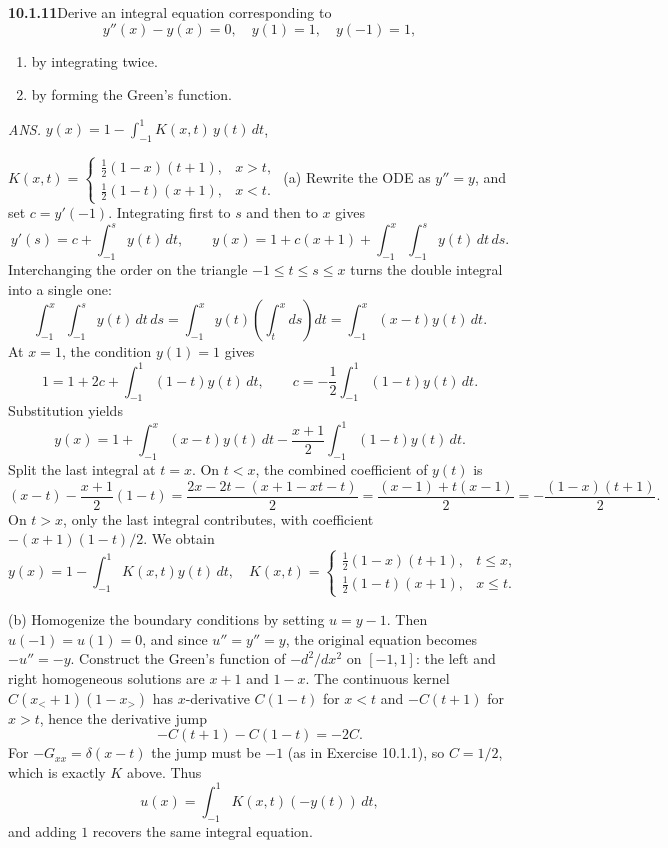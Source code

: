 \par\bigskip
\noindent\textbf{10.1.11}\quad Derive an integral equation corresponding to
\[
y''(x)-y(x)=0,\quad y(1)=1,\quad y(-1)=1,
\]
\begin{enumerate}
\item[(a)] by integrating twice.
\item[(b)] by forming the Green's function.
\end{enumerate}
\par\nobreak\hfill\emph{ANS.}\enspace
$y(x)=1-\displaystyle\int_{-1}^{1}K(x,t)\,y(t)\,dt$,\par
\nobreak\hfill
$K(x,t)=\begin{cases}
\frac{1}{2}(1-x)(t+1), & x>t,\\
\frac{1}{2}(1-t)(x+1), & x<t.
\end{cases}$
\solution
(a) Rewrite the ODE as $y''=y$, and set $c=y'(-1)$.
Integrating first to $s$ and then to $x$ gives
\[
y'(s)=c+\int_{-1}^s y(t)\,dt,
\qquad
y(x)=1+c(x+1)+\int_{-1}^x\int_{-1}^s y(t)\,dt\,ds.
\]
Interchanging the order on the triangle $-1\le t\le s\le x$ turns
the double integral into a single one:
\[
\int_{-1}^x\int_{-1}^s y(t)\,dt\,ds
=\int_{-1}^x y(t)\left(\int_t^x ds\right)dt
=\int_{-1}^x(x-t)y(t)\,dt.
\]
At $x=1$, the condition $y(1)=1$ gives
\[
1=1+2c+\int_{-1}^1(1-t)y(t)\,dt,
\qquad c=-\frac12\int_{-1}^1(1-t)y(t)\,dt.
\]
Substitution yields
\[
y(x)=1+\int_{-1}^x(x-t)y(t)\,dt
-\frac{x+1}{2}\int_{-1}^1(1-t)y(t)\,dt.
\]
Split the last integral at $t=x$. On $t<x$, the combined coefficient
of $y(t)$ is
\[
(x-t)-\frac{x+1}{2}(1-t)
=\frac{2x-2t-(x+1-xt-t)}{2}
=\frac{(x-1)+t(x-1)}{2}
=-\frac{(1-x)(t+1)}2.
\]
On $t>x$, only the last integral contributes, with coefficient
$-(x+1)(1-t)/2$. We obtain
\[
\boxed{y(x)=1-\int_{-1}^1K(x,t)y(t)\,dt,\quad
K(x,t)=\begin{cases}
\frac12(1-x)(t+1),&t\le x,\\
\frac12(1-t)(x+1),&x\le t.
\end{cases}}
\]

(b) Homogenize the boundary conditions by setting $u=y-1$.
Then $u(-1)=u(1)=0$, and since $u''=y''=y$, the original equation
becomes $-u''=-y$. Construct the Green's function of $-d^2/dx^2$ on
$[-1,1]$: the left and right homogeneous solutions are $x+1$ and $1-x$.
The continuous kernel $C(x_<+1)(1-x_>)$ has $x$-derivative $C(1-t)$
for $x<t$ and $-C(t+1)$ for $x>t$, hence the derivative jump
\[
-C(t+1)-C(1-t)=-2C.
\]
For $-G_{xx}=\delta(x-t)$ the jump must be $-1$ (as in
Exercise 10.1.1), so $C=1/2$, which is exactly $K$ above.
Thus
\[
u(x)=\int_{-1}^1K(x,t)(-y(t))\,dt,
\]
and adding $1$ recovers the same integral equation.

